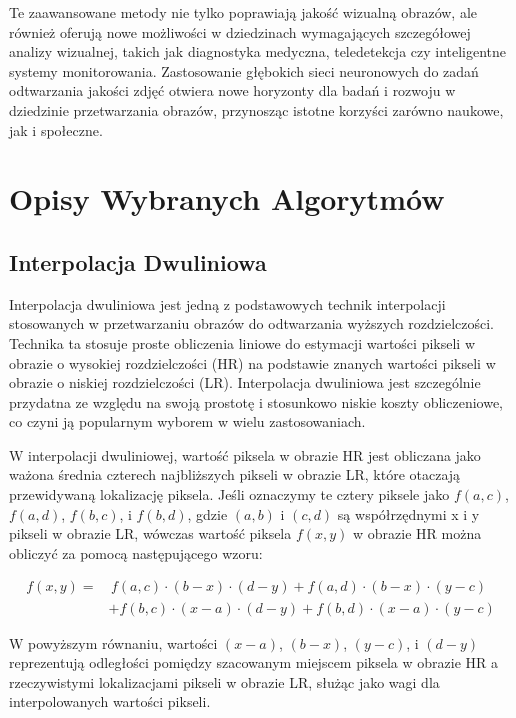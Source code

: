 \documentclass[10pt]{article}
\begin{document}
Te zaawansowane metody nie tylko poprawiają jakość wizualną obrazów, ale również oferują nowe możliwości w dziedzinach wymagających szczegółowej analizy wizualnej, takich jak diagnostyka medyczna, teledetekcja czy inteligentne systemy monitorowania. Zastosowanie głębokich sieci neuronowych do zadań odtwarzania jakości zdjęć otwiera nowe horyzonty dla badań i rozwoju w dziedzinie przetwarzania obrazów, przynosząc istotne korzyści zarówno naukowe, jak i społeczne.

\section*{Opisy Wybranych Algorytmów}
\subsection*{Interpolacja Dwuliniowa}
Interpolacja dwuliniowa jest jedną z podstawowych technik interpolacji stosowanych w przetwarzaniu obrazów do odtwarzania wyższych rozdzielczości. Technika ta stosuje proste obliczenia liniowe do estymacji wartości pikseli w obrazie o wysokiej rozdzielczości (HR) na podstawie znanych wartości pikseli w obrazie o niskiej rozdzielczości (LR). Interpolacja dwuliniowa jest szczególnie przydatna ze względu na swoją prostotę i stosunkowo niskie koszty obliczeniowe, co czyni ją popularnym wyborem w wielu zastosowaniach.

W interpolacji dwuliniowej, wartość piksela w obrazie HR jest obliczana jako ważona średnia czterech najbliższych pikseli w obrazie LR, które otaczają przewidywaną lokalizację piksela. Jeśli oznaczymy te cztery piksele jako \( f(a, c) \), \( f(a, d) \), \( f(b, c) \), i \( f(b, d) \), gdzie \( (a, b) \) i \( (c, d) \) są współrzędnymi x i y pikseli w obrazie LR, wówczas wartość piksela \( f(x, y) \) w obrazie HR można obliczyć za pomocą następującego wzoru:

\begin{align*}
f(x, y) = & \, f(a, c) \cdot (b - x) \cdot (d - y) + f(a, d) \cdot (b - x) \cdot (y - c) \\
          & + f(b, c) \cdot (x - a) \cdot (d - y) + f(b, d) \cdot (x - a) \cdot (y - c)
\end{align*}

W powyższym równaniu, wartości \( (x - a) \), \( (b - x) \), \( (y - c) \), i \( (d - y) \) reprezentują odległości pomiędzy szacowanym miejscem piksela w obrazie HR a rzeczywistymi lokalizacjami pikseli w obrazie LR, służąc jako wagi dla interpolowanych wartości pikseli.
\end{document}
